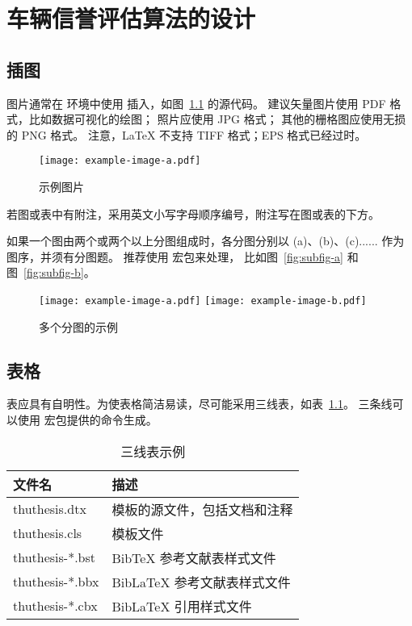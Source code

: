 
\chapter{车辆信誉评估算法的设计}

\section{插图}

图片通常在  环境中使用  插入，如图~\ref{fig:example} 的源代码。
建议矢量图片使用 PDF 格式，比如数据可视化的绘图；
照片应使用 JPG 格式；
其他的栅格图应使用无损的 PNG 格式。
注意，LaTeX 不支持 TIFF 格式；EPS 格式已经过时。

\begin{figure}
  \centering
  \texttt{[image: example-image-a.pdf]}
  \caption{示例图片}
  \label{fig:example}
\end{figure}

若图或表中有附注，采用英文小写字母顺序编号，附注写在图或表的下方。

如果一个图由两个或两个以上分图组成时，各分图分别以 (a)、(b)、(c)...... 作为图序，并须有分图题。
推荐使用  宏包来处理， 比如图~\ref{fig:subfig-a} 和图~\ref{fig:subfig-b}。

\begin{figure}
  \centering
    {\texttt{[image: example-image-a.pdf]}}
    {\texttt{[image: example-image-b.pdf]}}
  \caption{多个分图的示例}
  \label{fig:multi-image}
\end{figure}



\section{表格}

表应具有自明性。为使表格简洁易读，尽可能采用三线表，如表~\ref{tab:three-line}。
三条线可以使用  宏包提供的命令生成。

\begin{table}
  \centering
  \caption{三线表示例}
  \begin{tabular}{ll}
    \toprule
    文件名          & 描述                         \\
    \midrule
    thuthesis.dtx   & 模板的源文件，包括文档和注释 \\
    thuthesis.cls   & 模板文件                     \\
    thuthesis-*.bst & BibTeX 参考文献表样式文件    \\
    thuthesis-*.bbx & BibLaTeX 参考文献表样式文件  \\
    thuthesis-*.cbx & BibLaTeX 引用样式文件        \\
    \bottomrule
  \end{tabular}
  \label{tab:three-line}
\end{table}

